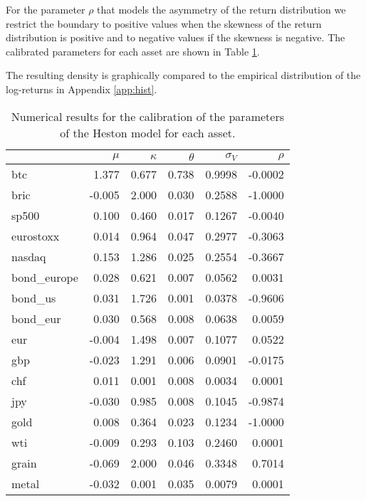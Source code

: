 For the parameter $\rho$ that models the asymmetry of the return distribution we restrict the boundary to positive values when the skewness of the return distribution is positive and to negative values if the skewness is negative. 
The calibrated parameters for each asset are shown in Table \ref{tab:heston_params}.

The resulting density is graphically compared to the empirical distribution of the log-returns in Appendix \ref{app:hist}.

\bigskip

\begin{table}
	\small
	\centering
	\caption[Heston calibrated parameters]{Numerical results for the calibration of the parameters of the Heston model for each asset.}
	\label{tab:heston_params}
	\begin{tabular}{lrrrrr}
		
		& $\mu$ & $\kappa$ & $\theta$ & $\sigma_V$ & $\rho$ \\
		\midrule
		btc & 1.377 & 0.677 & 0.738 & 0.9998 & -0.0002 \\
		bric & -0.005 & 2.000 & 0.030 & 0.2588 & -1.0000 \\
		sp500 & 0.100 & 0.460 & 0.017 & 0.1267 & -0.0040 \\
		eurostoxx & 0.014 & 0.964 & 0.047 & 0.2977 & -0.3063 \\
		nasdaq & 0.153 & 1.286 & 0.025 & 0.2554 & -0.3667 \\
		bond\_europe & 0.028 & 0.621 & 0.007 & 0.0562 & 0.0031 \\
		bond\_us & 0.031 & 1.726 & 0.001 & 0.0378 & -0.9606 \\
		bond\_eur & 0.030 & 0.568 & 0.008 & 0.0638 & 0.0059 \\
		eur & -0.004 & 1.498 & 0.007 & 0.1077 & 0.0522 \\
		gbp & -0.023 & 1.291 & 0.006 & 0.0901 & -0.0175 \\
		chf & 0.011 & 0.001 & 0.008 & 0.0034 & 0.0001 \\
		jpy & -0.030 & 0.985 & 0.008 & 0.1045 & -0.9874 \\
		gold & 0.008 & 0.364 & 0.023 & 0.1234 & -1.0000 \\
		wti & -0.009 & 0.293 & 0.103 & 0.2460 & 0.0001 \\
		grain & -0.069 & 2.000 & 0.046 & 0.3348 & 0.7014 \\
		metal & -0.032 & 0.001 & 0.035 & 0.0079 & 0.0001 \\
		\midrule
	\end{tabular}
\end{table}


